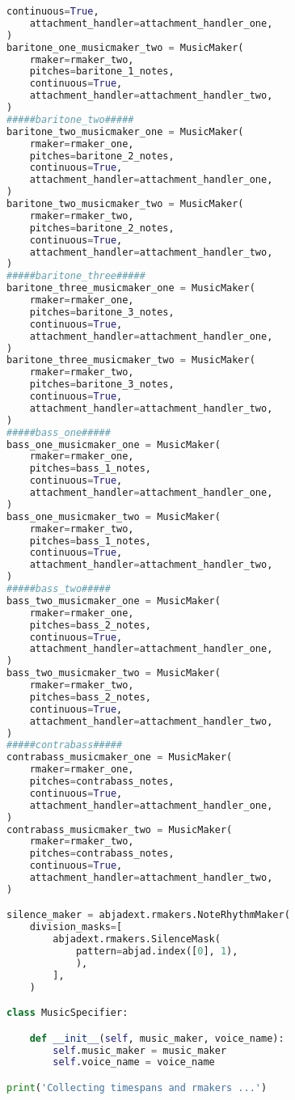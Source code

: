 \begin{lstlisting}[language=Python, caption=Invocation Source Code]
    continuous=True,
    attachment_handler=attachment_handler_one,
)
baritone_one_musicmaker_two = MusicMaker(
    rmaker=rmaker_two,
    pitches=baritone_1_notes,
    continuous=True,
    attachment_handler=attachment_handler_two,
)
#####baritone_two#####
baritone_two_musicmaker_one = MusicMaker(
    rmaker=rmaker_one,
    pitches=baritone_2_notes,
    continuous=True,
    attachment_handler=attachment_handler_one,
)
baritone_two_musicmaker_two = MusicMaker(
    rmaker=rmaker_two,
    pitches=baritone_2_notes,
    continuous=True,
    attachment_handler=attachment_handler_two,
)
#####baritone_three#####
baritone_three_musicmaker_one = MusicMaker(
    rmaker=rmaker_one,
    pitches=baritone_3_notes,
    continuous=True,
    attachment_handler=attachment_handler_one,
)
baritone_three_musicmaker_two = MusicMaker(
    rmaker=rmaker_two,
    pitches=baritone_3_notes,
    continuous=True,
    attachment_handler=attachment_handler_two,
)
#####bass_one#####
bass_one_musicmaker_one = MusicMaker(
    rmaker=rmaker_one,
    pitches=bass_1_notes,
    continuous=True,
    attachment_handler=attachment_handler_one,
)
bass_one_musicmaker_two = MusicMaker(
    rmaker=rmaker_two,
    pitches=bass_1_notes,
    continuous=True,
    attachment_handler=attachment_handler_two,
)
#####bass_two#####
bass_two_musicmaker_one = MusicMaker(
    rmaker=rmaker_one,
    pitches=bass_2_notes,
    continuous=True,
    attachment_handler=attachment_handler_one,
)
bass_two_musicmaker_two = MusicMaker(
    rmaker=rmaker_two,
    pitches=bass_2_notes,
    continuous=True,
    attachment_handler=attachment_handler_two,
)
#####contrabass#####
contrabass_musicmaker_one = MusicMaker(
    rmaker=rmaker_one,
    pitches=contrabass_notes,
    continuous=True,
    attachment_handler=attachment_handler_one,
)
contrabass_musicmaker_two = MusicMaker(
    rmaker=rmaker_two,
    pitches=contrabass_notes,
    continuous=True,
    attachment_handler=attachment_handler_two,
)

silence_maker = abjadext.rmakers.NoteRhythmMaker(
    division_masks=[
        abjadext.rmakers.SilenceMask(
            pattern=abjad.index([0], 1),
            ),
        ],
    )

class MusicSpecifier:

    def __init__(self, music_maker, voice_name):
        self.music_maker = music_maker
        self.voice_name = voice_name

print('Collecting timespans and rmakers ...')


\end{lstlisting}
